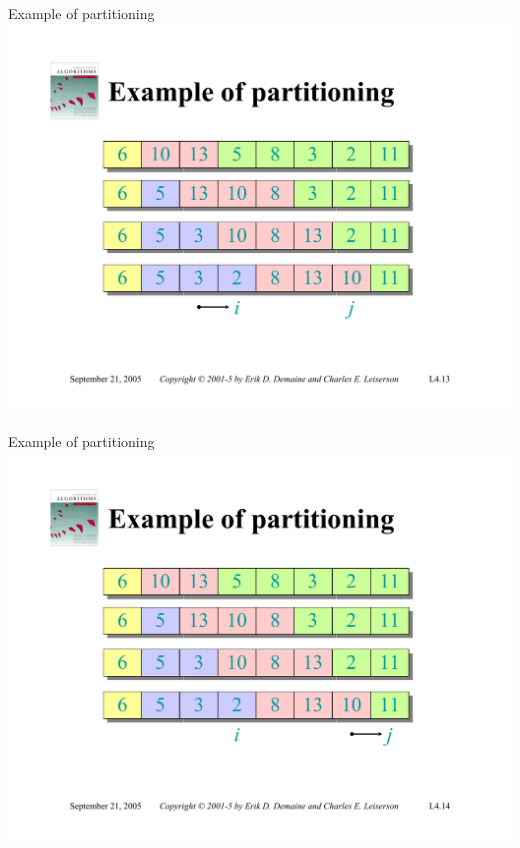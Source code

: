 \documentclass{beamer}
\begin{document}
\begin{frame}{Example of partitioning}
    \centering
    \includegraphics[width=\textwidth, trim={2.75cm 1.80cm 2.75cm 5.00cm}, clip]{pages/lec4_13}
\end{frame}
\begin{frame}{Example of partitioning}
    \centering
    \includegraphics[width=\textwidth, trim={2.75cm 1.80cm 2.75cm 5.00cm}, clip]{pages/lec4_14}
\end{frame}
\end{document}

